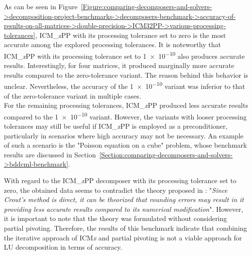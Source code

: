 \label{Text:comparing-decomposers-and-solvers->decomposition-project-benchmarks->decomposers-benchmark->accuracy-of-results-on-all-matrices->double-precision->ICM32PP->various-processing-tolerances->description-of-figure-with-accuracy-results}
As can be seen in Figure~\ref{Figure:comparing-decomposers-and-solvers->decomposition-project-benchmarks->decomposers-benchmark->accuracy-of-results-on-all-matrices->double-precision->ICM32PP->various-processing-tolerances}, ICM\_\textit{x}PP with its processing tolerance set to zero is the most accurate among the explored processing tolerances.
It is noteworthy that ICM\_\textit{x}PP with its processing tolerance set to \num{1e-10} also produces accurate results.
Interestingly, for four matrices, it produced marginally more accurate results compared to the zero-tolerance variant.
The reason behind this behavior is unclear.
Nevertheless, the accuracy of the \num{1e-10} variant was inferior to that of the zero-tolerance variant in multiple cases.\\
For the remaining processing tolerances, ICM\_\textit{x}PP produced less accurate results compared to the \num{1e-10} variant.
However, the variants with looser processing tolerances may still be useful if ICM\_\textit{x}PP is employed as a preconditioner, particularly in scenarios where high accuracy may not be necessary.
An example of such a scenario is the "Poisson equation on a cube" problem, whose benchmark results are discussed in Section~\ref{Section:comparing-decomposers-and-solvers->bddcml-benchmark}.

With regard to the ICM\_\textit{x}PP decomposer with its processing tolerance set to zero, the obtained data seems to contradict the theory proposed in  \cite{Cejka2022}: "\textit{Since Crout’s method is direct, it can be theorized that rounding errors may result in it providing less accurate results compared to its numerical modification}".
However, it is important to note that the theory was formulated without considering partial pivoting.
Therefore, the results of this benchmark indicate that combining the iterative approach of ICM\textit{x} and partial pivoting is not a viable approach for LU decomposition in terms of accuracy.

